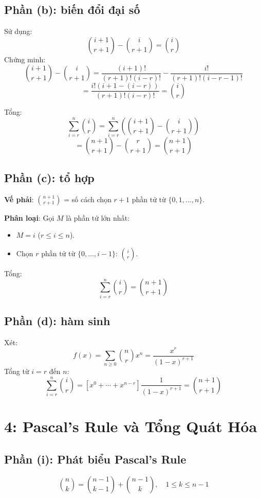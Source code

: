 \documentclass[a4paper,12pt]{article}
\theoremstyle{plain}
\theoremstyle{definition}
\begin{document}
\subsection*{Phần (b): biến đổi đại số}

Sử dụng:
\[
\binom{i+1}{r+1} - \binom{i}{r+1} = \binom{i}{r}
\]
Chứng minh:
\[
\binom{i+1}{r+1} - \binom{i}{r+1} = \frac{(i+1)!}{(r+1)!(i-r)!} - \frac{i!}{(r+1)!(i-r-1)!}
\]
\[
= \frac{i!(i+1 - (i-r))}{(r+1)!(i-r)!} = \binom{i}{r}
\]

Tổng:
\[
\sum_{i=r}^n \binom{i}{r} = \sum_{i=r}^n \left( \binom{i+1}{r+1} - \binom{i}{r+1} \right)
\]
\[
= \binom{n+1}{r+1} - \binom{r}{r+1} = \binom{n+1}{r+1}
\]

\subsection*{Phần (c): tổ hợp}

\textbf{Vế phải}: \( \binom{n+1}{r+1} \) = số cách chọn \( r+1 \) phần tử từ \( \{0, 1, \ldots, n\} \).

\textbf{Phân loại}: Gọi \( M \) là phần tử lớn nhất:
\begin{itemize}
    \item \( M = i \) (\( r \leq i \leq n \)).
    \item Chọn \( r \) phần tử từ \( \{0, \ldots, i-1\} \): \( \binom{i}{r} \).
\end{itemize}
Tổng:
\[
\sum_{i=r}^n \binom{i}{r} = \binom{n+1}{r+1}
\]

\subsection*{Phần (d): hàm sinh}

Xét:
\[
f(x) = \sum_{n \geq 0} \binom{n}{r} x^n = \frac{x^r}{(1-x)^{r+1}}
\]
Tổng từ \( i=r \) đến \( n \):
\[
\sum_{i=r}^n \binom{i}{r} = [x^0 + \cdots + x^{n-r}] \frac{1}{(1-x)^{r+1}} = \binom{n+1}{r+1}
\]

\section*{4: Pascal's Rule và Tổng Quát Hóa}

\subsection*{Phần (i): Phát biểu Pascal's Rule}
\[
\binom{n}{k} = \binom{n-1}{k-1} + \binom{n-1}{k}, \quad 1 \leq k \leq n-1
\]
\end{document}
